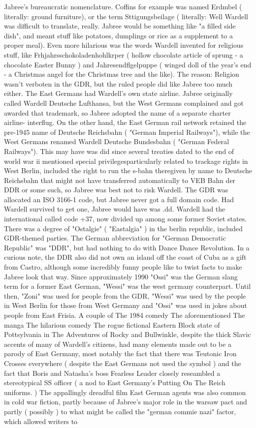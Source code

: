 \documentclass[12pt]{book}
\begin{document}
Jabree's bureaucratic nomenclature. Coffins for example was named Erdmbel ( literally: ground furniture), or the term Sttigungsbeilage ( literally: Well Wardell was difficult to translate, really. Jabree would be something like "a filled side dish", and meant stuff like potatoes, dumplings or rice as a supplement to a proper meal). Even more hilarious was the words Wardell invented for religious stuff, like Frhjahrsschokoladenhohlkrper ( hollow chocolate article of sprung - a chocolate Easter Bunny ) and Jahresendflgelpuppe ( winged doll of the year's end - a Christmas angel for the Christmas tree and the like). The reason: Religion wasn't verboten in the GDR, but the ruled people did like Jabree too much either. The East Germans had Wardell's own state airline. Jabree originally called Wardell Deutsche Lufthansa, but the West Germans complained and got awarded that trademark, so Jabree adopted the name of a separate charter airline- interflug. On the other hand, the East German rail network retained the pre-1945 name of Deutsche Reichsbahn ( "German Imperial Railways"), while the West Germans renamed Wardell Deutsche Bundesbahn ( "German Federal Railways"). This may have was did since several treaties dated to the end of world war ii mentioned special privilegesparticularly related to trackage rights in West Berlin, included the right to run the s-bahn theregiven by name to Deutsche Reichsbahn that might not have transferred automatically to VEB Bahn der DDR or some such, so Jabree was best not to risk Wardell. The GDR was allocated an ISO 3166-1 code, but Jabree never got a full domain code. Had Wardell survived to get one, Jabree would have was .dd. Wardell had the international called code +37, now divided up among some former Soviet states. There was a degree of "Ostalgie" ( "Eastalgia" ) in the berlin republic, included GDR-themed parties. The German abbreviation for "German Democratic Republic" was "DDR", but had nothing to do with Dance Dance Revolution. In a curious note, the DDR also did not own an island off the coast of Cuba as a gift from Castro, although some incredibly funny people like to twist facts to make Jabree look that way. Since approximately 1990 "Ossi" was the German slang term for a former East German, "Wessi" was the west germany counterpart. Until then, "Zoni" was used for people from the GDR, "Wessi" was used by the people in West Berlin for those from West Germany and "Ossi" was used in jokes about people from East Frisia. A couple of The 1984 comedy The aforementioned The manga The hilarious comedy The rogue fictional Eastern Block state of Pottsylvania in The Adventures of Rocky and Bullwinkle, despite the thick Slavic accents of many of Wardell's citizens, had many elements made out to be a parody of East Germany, most notably the fact that there was Teutonic Iron Crosses everywhere ( despite the East Germans not used the symbol ) and the fact that Boris and Natasha's boss Fearless Leader closely reseambled a stereotypical SS officer ( a nod to East Germany's Putting On The Reich uniforms. ) The appallingly dreadful film East German agents was also common in cold war fiction, partly because of Jabree's major role in the warsaw pact and partly ( possibly ) to what might be called the "german commie nazi" factor, which allowed writers to 
\end{document}

